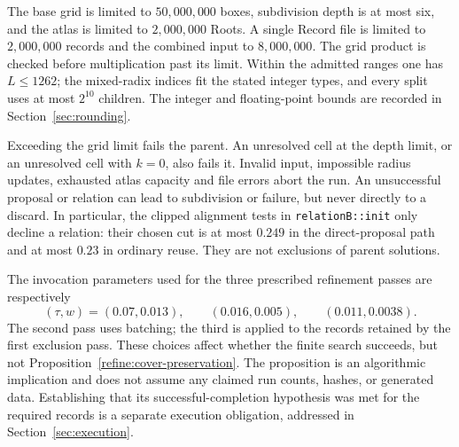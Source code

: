 The base grid is limited to $50{,}000{,}000$ boxes, subdivision depth is
at most six, and the atlas is limited to $2{,}000{,}000$ Roots.  A single
Record file is limited to $2{,}000{,}000$ records and the combined input
to $8{,}000{,}000$.  The grid product is checked before multiplication
past its limit.  Within the admitted ranges one has $L\leq1262$;
the mixed-radix indices fit the stated integer types, and every split
uses at most $2^{10}$ children.  The integer and floating-point bounds
are recorded in Section~\ref{sec:rounding}.

Exceeding the grid limit fails the parent.  An unresolved cell at the
depth limit, or an unresolved cell with $k=0$, also fails it.  Invalid
input, impossible radius updates, exhausted atlas capacity and file
errors abort the run.  An unsuccessful proposal or relation can lead
to subdivision or failure, but never directly to a discard.  In
particular, the clipped alignment tests in \texttt{relationB::init}
only decline a relation: their chosen cut is at most $0.249$ in the
direct-proposal path and at most $0.23$ in ordinary reuse.  They are
not exclusions of parent solutions.

The invocation parameters used for the three prescribed refinement
passes are respectively
\[
 (\tau,w)=(0.07,0.013),\qquad
 (0.016,0.005),\qquad
 (0.011,0.0038).
\]
The second pass uses batching; the third is applied to the records
retained by the first exclusion pass.  These choices affect whether
the finite search succeeds, but not
Proposition~\ref{refine:cover-preservation}.  The proposition is an
algorithmic implication and does not assume any claimed run counts,
hashes, or generated data.  Establishing that its successful-completion
hypothesis was met for the required records is a separate execution
obligation, addressed in Section~\ref{sec:execution}.
